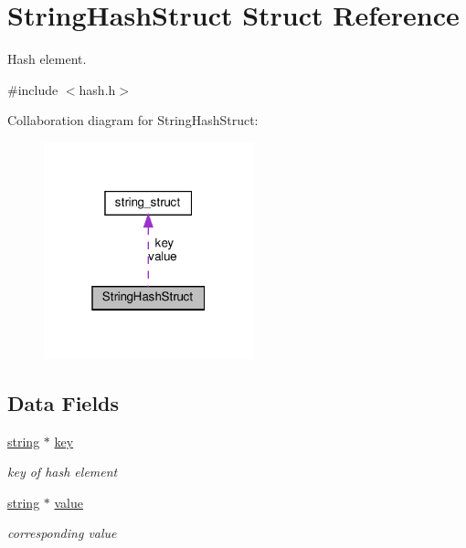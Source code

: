 \hypertarget{struct_string_hash_struct}{}\section{String\+Hash\+Struct Struct Reference}
\label{struct_string_hash_struct}


Hash element.  




{\ttfamily \#include $<$hash.\+h$>$}



Collaboration diagram for String\+Hash\+Struct\+:
\nopagebreak
\begin{figure}[H]
\begin{center}
\leavevmode
\includegraphics[width=172pt]{struct_string_hash_struct__coll__graph}
\end{center}
\end{figure}
\subsection*{Data Fields}
\begin{DoxyCompactItemize}
\item 
\hyperlink{string_8h_a3d2981d9da3e25dd89371059777fdd12}{string} $\ast$ \hyperlink{struct_string_hash_struct_ad3cf34b56feec46985e00e0854246e15}{key}
\begin{DoxyCompactList}\small\item\em key of hash element \end{DoxyCompactList}\item 
\hyperlink{string_8h_a3d2981d9da3e25dd89371059777fdd12}{string} $\ast$ \hyperlink{struct_string_hash_struct_ad449ecfeb67fd201ad7ece234f18823b}{value}
\begin{DoxyCompactList}\small\item\em corresponding value \end{DoxyCompactList}\end{DoxyCompactItemize}


